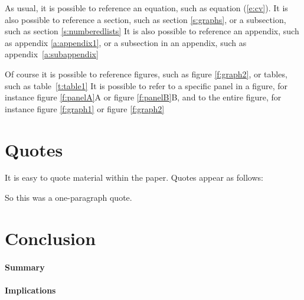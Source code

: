 \documentclass{article}
\begin{document}
As usual, it is possible to reference an equation, such as equation (\ref{e:cv}). It is also possible to reference a section, such as section \ref{s:graphs}, or a subsection, such as section \ref{s:numberedlists} It is also possible to reference an appendix, such as appendix \ref{a:appendix1}, or a subsection in an appendix, such as appendix~\ref{a:subappendix} 

Of course it is possible to reference figures, such as figure \ref{f:graph2}, or tables, such as table~\ref{t:table1} It is possible to refer to a specific panel in a figure, for instance figure \ref{f:panelA}A or figure \ref{f:panelB}B, and to the entire figure, for instance figure \ref{f:graph1} or figure \ref{f:graph2}

\section{Quotes}

It is easy to quote material within the paper. \wcTpLoremIpsum*[type=sentence,words-per-sentence=65,seed=155]{}  Quotes appear as follows:


So this was a one-paragraph quote. \wcTpLoremIpsum*[type=sentence,words-per-sentence=41,seed=156]{}  

\section{Conclusion}\label{s:ccl}

\paragraph{Summary} \wcTpLoremIpsum*[type=sentence,words-per-sentence=67,seed=157]{} 

\paragraph{Implications} \wcTpLoremIpsum*[type=sentence,words-per-sentence=103,seed=158]{}  
\end{document}
